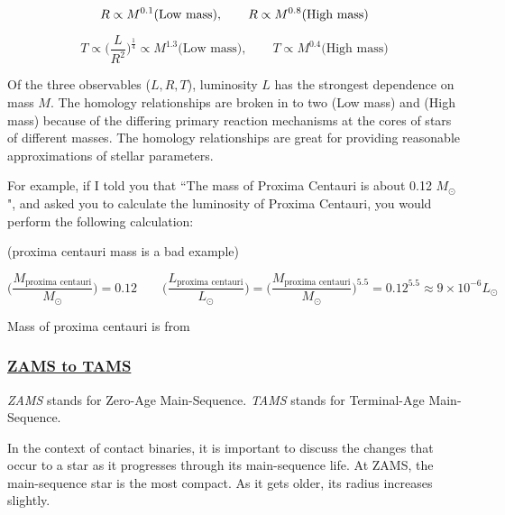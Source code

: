 \documentclass[12pt]{article} %
\numberwithin{equation}{section} %
\begin{document}
\begin{equation} \label{homology_R}
R \propto M^{0.1} \text{(Low mass)}, \qquad R \propto M^{0.8} \text{(High mass)}  \\
\end{equation}

\begin{equation} \label{homology_T}
T \propto \bigg(\frac{L}{R^{2}}\bigg)^{\frac{1}{4}} \propto M^{1.3} \text{(Low mass)}, \qquad T \propto M^{0.4} \text{(High mass)} 
\end{equation}

Of the three observables ($L, R, T$), luminosity $L$ has the strongest dependence on mass $M$. The homology relationships are broken in to two (Low mass) and (High mass) because of the differing primary reaction mechanisms at the cores of stars of different masses. The homology relationships are great for providing reasonable approximations of stellar parameters. 

For example, if I told you that ``The mass of Proxima Centauri is about 0.12 $M_{\odot}$", and asked you to calculate the luminosity of Proxima Centauri, you would perform the following calculation:

(proxima centauri mass is a bad example)

\begin{equation} \label{homology_ex}
\Big( \frac{M_{\text{proxima centauri}}}{M_{\odot}} \Big) = 0.12 \qquad \Big( \frac{L_{\text{proxima centauri}}}{L_{\odot}} \Big) = \Big( \frac{M_{\text{proxima centauri}}}{M_{\odot}} \Big)^{5.5} = 0.12^{5.5} \approx 9 \times 10^{-6} L_{\odot}
\end{equation}

Mass of proxima centauri is from \citep{segransan2003first}

\subsubsection[ZAMS to TAMS]{\hyperlink{toc}{ZAMS to TAMS}} \label{sec: ZAMS to TAMS}

\emph{ZAMS} stands for Zero-Age Main-Sequence. \emph{TAMS} stands for Terminal-Age Main-Sequence.

In the context of contact binaries, it is important to discuss the changes that occur to a star as it progresses through its main-sequence life. At ZAMS, the main-sequence star is the most compact. As it gets older, its radius increases slightly.
\end{document}
